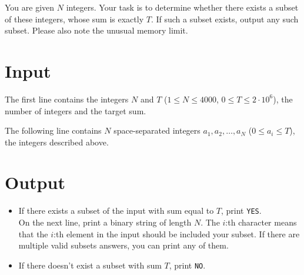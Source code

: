 You are given $N$ integers. Your task is to determine whether there exists a subset of these integers, whose
sum is exactly $T$. If such a subset exists, output any such subset. Please also note the unusual memory limit.

\section*{Input}
The first line contains the integers $N$ and $T$ ($1 \leq N \leq 4000$, $0 \leq T \leq 2 \cdot 10^6$), the number of
integers and the target sum.

The following line contains $N$ space-separated integers $a_1, a_2, \dots, a_N$ ($0 \leq a_i \leq T$), the integers
described above.

\section*{Output}
\begin{itemize}
    \item If there exists a subset of the input with sum equal to $T$, print \texttt{YES}. \\
    On the next line, print a binary string of length $N$. The $i$:th character means that
    the $i$:th element in the input should be included your subset. If there are multiple valid subsets
    answers, you can print any of them.
    \item If there doesn't exist a subset with sum $T$, print \texttt{NO}.    
\end{itemize}
